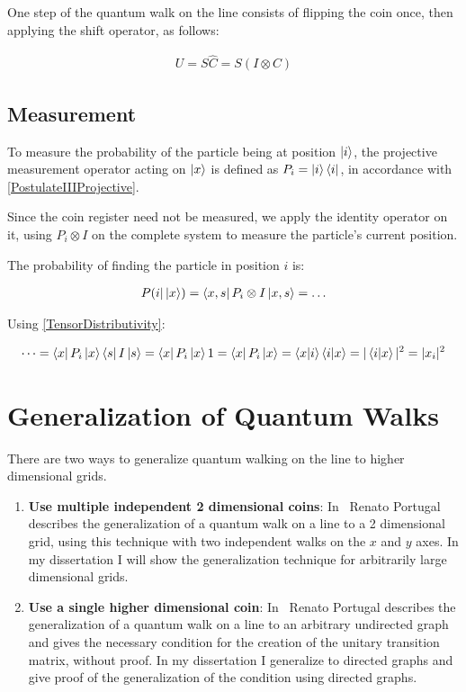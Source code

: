 
One step of the quantum walk on the line consists of flipping the coin once, then applying the shift operator, as follows:

\begin{align*}
    U = S\hat{C} = S(I\otimes{}C)
\end{align*}

\subsection{Measurement}

To measure the probability of the particle being at position $\ket{i}$, the projective measurement operator acting on $\ket{x}$ is defined as $P_i = \ket{i}\bra{i}$, in accordance with \hyperref[PostulateIIIProjective]{[PostulateIIIProjective]}.

Since the coin register need not be measured, we apply the identity operator on it, using $P_i \otimes I$ on the complete system to measure the particle's current position.

The probability of finding the particle in position $i$ is:

\begin{gather*}
    P(i | \ket{x}) = \bra{x,s}P_i\otimes{}I\ket{x,s} = \dots
\end{gather*}

Using \hyperref[TensorDistributivity]{[TensorDistributivity]}:

\begin{gather*}
    \dots = \bra{x}P_i\ket{x}\bra{s}I\ket{s} =
    \bra{x}P_i\ket{x}1 =
    \bra{x}P_i\ket{x} =
    \bra{x}\ket{i}\bra{i}\ket{x} =
    |\bra{i}\ket{x}|^2 =
    |x_i|^2
\end{gather*}


\section{Generalization of Quantum Walks}

There are two ways to generalize quantum walking on the line to higher dimensional grids.

\begin{enumerate}
    \item \textbf{Use multiple independent 2 dimensional coins}: In~\cite{Portugal} Renato Portugal describes the generalization of a quantum walk on a line to a 2 dimensional grid, using this technique with two independent walks on the $x$ and $y$ axes. In my dissertation I will show the generalization technique for arbitrarily large dimensional grids.
    \item \textbf{Use a single higher dimensional coin}: In~\cite{Portugal} Renato Portugal describes the generalization of a quantum walk on a line to an arbitrary undirected graph and gives the necessary condition for the creation of the unitary transition matrix, without proof. In my dissertation I generalize to directed graphs and give proof of the generalization of the condition using directed graphs.
\end{enumerate}

